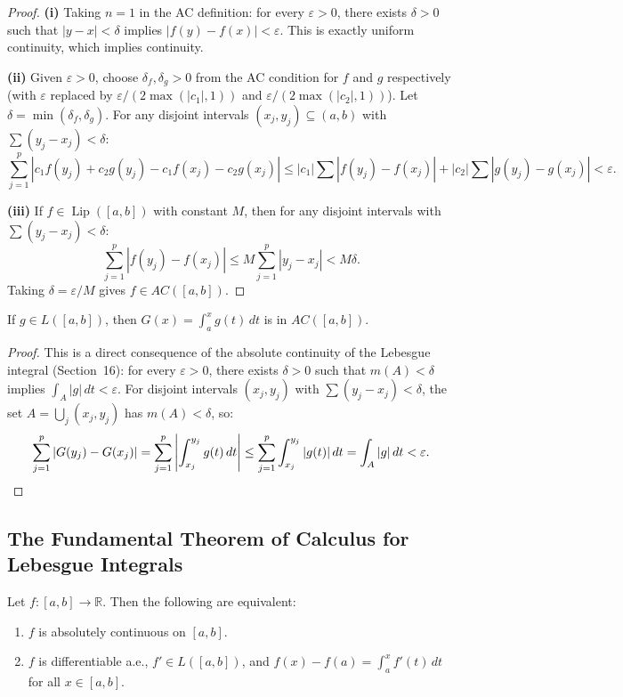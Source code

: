 \documentclass[11pt]{report}
\begin{document}
\begin{proof}
\textbf{(i)} Taking $n = 1$ in the AC definition: for every $\varepsilon > 0$, there exists $\delta > 0$ such that $|y - x| < \delta$ implies $|f(y) - f(x)| < \varepsilon$. This is exactly uniform continuity, which implies continuity.

\textbf{(ii)} Given $\varepsilon > 0$, choose $\delta_f, \delta_g > 0$ from the AC condition for $f$ and $g$ respectively (with $\varepsilon$ replaced by $\varepsilon/(2\max(|c_1|, 1))$ and $\varepsilon/(2\max(|c_2|, 1))$). Let $\delta = \min(\delta_f, \delta_g)$. For any disjoint intervals $(x_j, y_j) \subseteq (a, b)$ with $\sum (y_j - x_j) < \delta$:
\[
\sum_{j=1}^{p} |c_1 f(y_j) + c_2 g(y_j) - c_1 f(x_j) - c_2 g(x_j)| \leq |c_1| \sum |f(y_j) - f(x_j)| + |c_2| \sum |g(y_j) - g(x_j)| < \varepsilon.
\]

\textbf{(iii)} If $f \in \operatorname{Lip}([a, b])$ with constant $M$, then for any disjoint intervals with $\sum (y_j - x_j) < \delta$:
\[
\sum_{j=1}^{p} |f(y_j) - f(x_j)| \leq M \sum_{j=1}^{p} |y_j - x_j| < M\delta.
\]
Taking $\delta = \varepsilon/M$ gives $f \in AC([a, b])$.
\end{proof}

\begin{thmbox}
If $g \in L([a, b])$, then $G(x) = \int_a^x g(t)\,dt$ is in $AC([a, b])$.
\end{thmbox}

\begin{proof}
This is a direct consequence of the absolute continuity of the Lebesgue integral (Section~16): for every $\varepsilon > 0$, there exists $\delta > 0$ such that $m(A) < \delta$ implies $\int_A |g|\,dt < \varepsilon$. For disjoint intervals $(x_j, y_j)$ with $\sum (y_j - x_j) < \delta$, the set $A = \bigcup_j (x_j, y_j)$ has $m(A) < \delta$, so:
\[
\sum_{j=1}^{p} |G(y_j) - G(x_j)| = \sum_{j=1}^{p} \left|\int_{x_j}^{y_j} g(t)\,dt\right| \leq \sum_{j=1}^{p} \int_{x_j}^{y_j} |g(t)|\,dt = \int_A |g|\,dt < \varepsilon. \qedhere
\]
\end{proof}

\subsection{The Fundamental Theorem of Calculus for Lebesgue Integrals}

\begin{thmbox}
Let $f: [a, b] \to \mathbb{R}$. Then the following are equivalent:
\begin{enumerate}[label=(\roman*)]
\item $f$ is absolutely continuous on $[a, b]$.
\item $f$ is differentiable a.e., $f' \in L([a, b])$, and $f(x) - f(a) = \int_a^x f'(t)\,dt$ for all $x \in [a, b]$.
\end{enumerate}
\end{thmbox}
\end{document}

